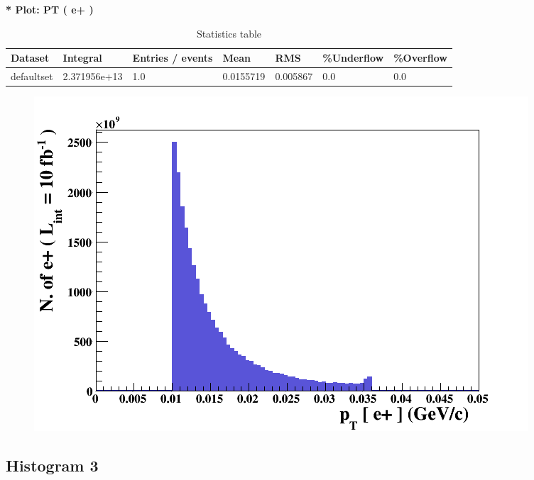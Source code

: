 \documentclass[a4paper, 11pt]{article}
\begin{document}
   \textbf{   * Plot: PT ( e+ ) }
\textbf{ }\begin{table}[!h]
  \begin{center}
    \caption{ Statistics table}
    \begin{tabular}{|m{17.0mm}|m{27.0mm}|m{23.0mm}|m{18.0mm}|m{18.0mm}|m{14.0mm}|m{14.0mm}|}
      \hline
      \cellcolor{yellow}         Dataset& \cellcolor{yellow}         Integral& \cellcolor{yellow}         Entries /\- events& \cellcolor{yellow}         Mean& \cellcolor{yellow}         RMS& \cellcolor{yellow}         \%Underflow& \cellcolor{yellow}         \%Overflow\\
      \hline
      \cellcolor{white}         defaultset& \cellcolor{white}         2.371956e+13& \cellcolor{white}         1.0& \cellcolor{white}         0.0155719& \cellcolor{white}         0.005867& \cellcolor{green}         0.0& \cellcolor{green}         0.0\\
\hline
    \end{tabular}
  \end{center}
\end{table}

\begin{figure}[!h]
  \begin{center}
    \includegraphics[scale=0.6]{selection_1.png}\\
\caption{}
  \end{center}
\end{figure}
\newpage
   \newpage
\subsection{ Histogram 3}
\end{document}
